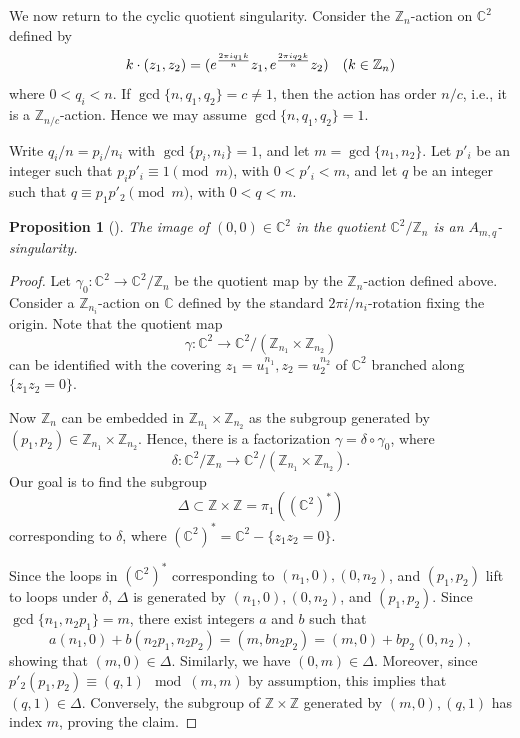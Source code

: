 \documentclass[10pt,a4paper,reqno]{amsart}
\newtheorem{prop}[thm]{Proposition}
\theoremstyle{definition}
\numberwithin{equation}{section}
\numberwithin{figure}{section}
\newcommand{\Z}{\mathbb{Z}}
\newcommand{\C}{\mathbb{C}}
\newcommand{\arrowr}{\rightarrow}
\begin{document}
We now return to the cyclic quotient singularity.
Consider the $\Z_n$-action on $\C^2$ defined by 
\begin{equation}
k\cdot (z_1,z_2)=(e^{\frac{2\pi i q_1 k}{n}}z_1, e^{\frac{2\pi i q_2 k}{n}}z_2) \hskip 1em (k\in\Z_n)
\end{equation}
where $0<q_i<n$.
If $\gcd\{n,q_1,q_2\}=c\neq 1$, then the action has order $n/c$, i.e., it is a $\Z_{n/c}$-action. 
Hence we may assume $\gcd\{n,q_1,q_2\}=1$.

Write $q_i/n=p_i/n_i$ with $\gcd\{p_i, n_i\}=1$, and let $m=\gcd\{n_1, n_2\}$.
Let $p'_i$ be an integer such that $p_i p'_i \equiv 1 \pmod m$, with $0<p'_i<m$,
and let $q$ be an integer such that $q\equiv p_1 p'_2 \pmod m$, with $0<q<m$.

\begin{prop}[\cite{BHPV}]
The image of $(0,0)\in \C^2$ in the quotient $\C^2/\Z_n$ is an $A_{m,q}$-singularity.
\end{prop}

\begin{proof}
Let $\gamma_0:\C^2 \arrowr \C^2/\Z_n$ be the quotient map by the $\Z_n$-action defined above.
Consider a $\Z_{n_i}$-action on $\C$ defined by the standard $2\pi i/n_i$-rotation fixing the origin.
Note that the quotient map \[\gamma:\C^2 \arrowr \C^2/(\Z_{n_1}\times \Z_{n_2})\]
can be identified with the covering $z_1=u_1^{n_1}, z_2=u_2^{n_2}$ of $\C^2$ branched along $\{z_1z_2=0\}$.

Now $\Z_n$ can be embedded in $\Z_{n_1}\times \Z_{n_2}$ as the subgroup generated by $(p_1, p_2)\in \Z_{n_1}\times \Z_{n_2}$. 
Hence, there is a factorization $\gamma=\delta \circ \gamma_0$, where
\[\delta: \C^2/\Z_n \arrowr \C^2/(\Z_{n_1}\times \Z_{n_2}).\]
Our goal is to find the subgroup \[\Delta\subset \Z\times \Z=\pi_1((\C^2)^*)\] corresponding to $\delta$, where $(\C^2)^*=\C^2-\{z_1z_2=0\}$.

Since the loops in $(\C^2)^*$ corresponding to $(n_1, 0), (0,n_2)$, and $(p_1, p_2)$ lift to loops under $\delta$, 
$\Delta$ is generated by $(n_1, 0), (0,n_2)$, and $(p_1, p_2)$.
Since $\gcd\{n_1,n_2p_1\}=m$, there exist integers $a$ and $b$ such that
\[a(n_1,0)+b(n_2p_1, n_2p_2)=(m,bn_2 p_2)=(m,0)+bp_2(0,n_2),\]
showing that $(m,0)\in \Delta$. 
Similarly, we have $(0,m)\in \Delta$.
Moreover, since $p'_2(p_1,p_2)\equiv (q,1) \mod (m,m)$ by assumption, this implies that $(q,1)\in \Delta$.
Conversely, the subgroup of $\Z\times \Z$ generated by $(m,0), (q,1)$ has index $m$, proving the claim.
\end{proof}
\end{document}

